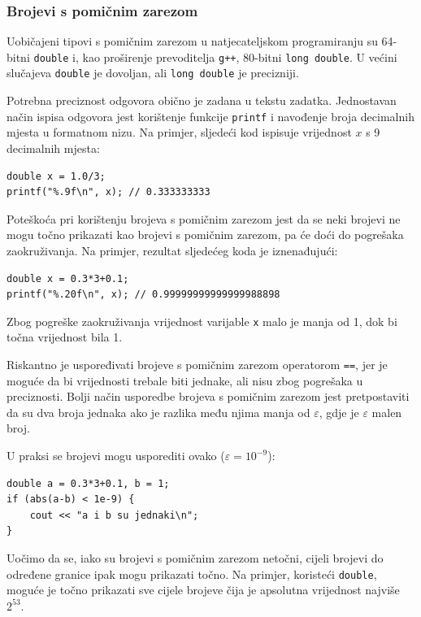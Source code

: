 \subsubsection{Brojevi s pomičnim zarezom}


Uobičajeni tipovi s pomičnim zarezom u
natjecateljskom programiranju su
64-bitni \texttt{double}
i, kao proširenje prevoditelja \texttt{g++},
80-bitni \texttt{long double}.
U većini slučajeva \texttt{double} je dovoljan,
ali \texttt{long double} je precizniji.

Potrebna preciznost odgovora
obično je zadana u tekstu zadatka.
Jednostavan način ispisa odgovora jest korištenje
funkcije \texttt{printf}
i navođenje broja decimalnih mjesta
u formatnom nizu.
Na primjer, sljedeći kod ispisuje
vrijednost $x$ s 9 decimalnih mjesta:

\begin{lstlisting}
double x = 1.0/3;
printf("%.9f\n", x); // 0.333333333
\end{lstlisting}

Poteškoća pri korištenju brojeva s pomičnim zarezom
jest da se neki brojevi ne mogu točno
prikazati kao brojevi s pomičnim zarezom,
pa će doći do pogrešaka zaokruživanja.
Na primjer, rezultat sljedećeg koda
je iznenađujući:

\begin{lstlisting}
double x = 0.3*3+0.1;
printf("%.20f\n", x); // 0.99999999999999988898
\end{lstlisting}

Zbog pogreške zaokruživanja
vrijednost varijable \texttt{x} malo je manja od 1,
dok bi točna vrijednost bila 1.

Riskantno je uspoređivati brojeve s pomičnim zarezom
operatorom \texttt{==},
jer je moguće da bi vrijednosti trebale biti
jednake, ali nisu zbog pogrešaka u preciznosti.
Bolji način usporedbe brojeva s pomičnim zarezom
jest pretpostaviti da su dva broja jednaka
ako je razlika među njima manja od $\varepsilon$,
gdje je $\varepsilon$ malen broj.

U praksi se brojevi mogu usporediti
ovako ($\varepsilon=10^{-9}$):

\begin{lstlisting}
double a = 0.3*3+0.1, b = 1;
if (abs(a-b) < 1e-9) {
    cout << "a i b su jednaki\n";
}
\end{lstlisting}

Uočimo da se, iako su brojevi s pomičnim zarezom netočni,
cijeli brojevi do određene granice ipak mogu
prikazati točno.
Na primjer, koristeći \texttt{double},
moguće je točno prikazati sve
cijele brojeve čija je apsolutna vrijednost najviše $2^{53}$.

